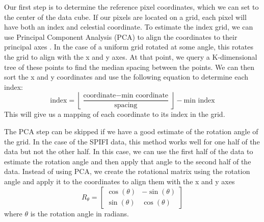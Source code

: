 Our first step is to determine the reference pixel coordinates, which we can set to the center of the data cube.
If our pixels are located on a grid, each pixel will have both an index and celestial coordinate.
To estimate the index grid, we can use Principal Component Analysis (PCA) to align the coordinates to their principal axes \parencite{wold1987principal}.
In the case of a uniform grid rotated at some angle, this rotates the grid to align with the x and y axes.
At that point, we query a K-dimensional tree of these points to find the median spacing between the points.
We can then sort the x and y coordinates and use the following equation to determine each index:
\begin{equation}
    \text{index} = \left\lfloor \frac{\text{coordinate} - \text{min coordinate}}{\text{spacing}} \right\rfloor - \text{min index}
    \label{carina/eq:index}
\end{equation}
This will give us a mapping of each coordinate to its index in the grid.

The PCA step can be skipped if we have a good estimate of the rotation angle of the grid.
In the case of the SPIFI data, this method works well for one half of the data but not the other half.
In this case, we can use the first half of the data to estimate the rotation angle and then apply that angle to the second half of the data.
Instead of using PCA, we create the rotational matrix using the rotation angle and apply it to the coordinates to align them with the x and y axes 
\begin{equation}
    R_\theta = \begin{bmatrix}
        \cos(\theta) & -\sin(\theta) \\
        \sin(\theta) & \cos(\theta)
    \end{bmatrix}
\end{equation}
where $\theta$ is the rotation angle in radians.


